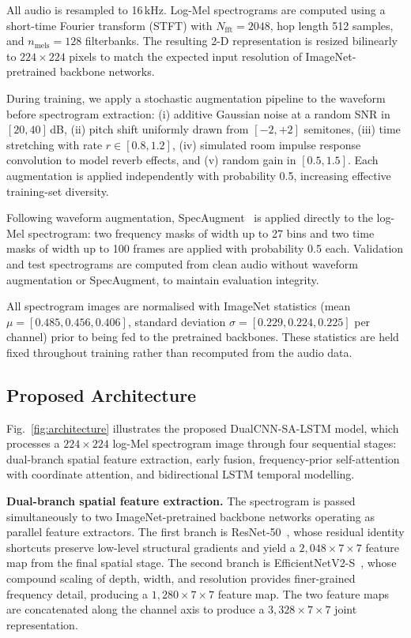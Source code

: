 \documentclass[conference]{IEEEtran}
\begin{document}
All audio is resampled to 16\,kHz. Log-Mel spectrograms are computed using a short-time Fourier transform (STFT) with $N_{\text{fft}}=2048$, hop length 512 samples, and $n_{\text{mels}}=128$ filterbanks. The resulting 2-D representation is resized bilinearly to $224\times224$ pixels to match the expected input resolution of ImageNet-pretrained backbone networks.

During training, we apply a stochastic augmentation pipeline to the waveform before spectrogram extraction: (i) additive Gaussian noise at a random SNR in $[20, 40]$\,dB, (ii) pitch shift uniformly drawn from $[-2, +2]$ semitones, (iii) time stretching with rate $r \in [0.8, 1.2]$, (iv) simulated room impulse response convolution to model reverb effects, and (v) random gain in $[0.5, 1.5]$. Each augmentation is applied independently with probability 0.5, increasing effective training-set diversity.

Following waveform augmentation, SpecAugment~\cite{park2019} is applied directly to the log-Mel spectrogram: two frequency masks of width up to 27 bins and two time masks of width up to 100 frames are applied with probability 0.5 each. Validation and test spectrograms are computed from clean audio without waveform augmentation or SpecAugment, to maintain evaluation integrity.

All spectrogram images are normalised with ImageNet statistics (mean $\mu = [0.485, 0.456, 0.406]$, standard deviation $\sigma = [0.229, 0.224, 0.225]$ per channel) prior to being fed to the pretrained backbones. These statistics are held fixed throughout training rather than recomputed from the audio data.

\subsection{Proposed Architecture}

Fig.~\ref{fig:architecture} illustrates the proposed DualCNN-SA-LSTM model, which processes a $224\times224$ log-Mel spectrogram image through four sequential stages: dual-branch spatial feature extraction, early fusion, frequency-prior self-attention with coordinate attention, and bidirectional LSTM temporal modelling.

\textbf{Dual-branch spatial feature extraction.} The spectrogram is passed simultaneously to two ImageNet-pretrained backbone networks operating as parallel feature extractors. The first branch is ResNet-50~\cite{he2016}, whose residual identity shortcuts preserve low-level structural gradients and yield a $2{,}048\times 7\times 7$ feature map from the final spatial stage. The second branch is EfficientNetV2-S~\cite{tan2021}, whose compound scaling of depth, width, and resolution provides finer-grained frequency detail, producing a $1{,}280\times 7\times 7$ feature map. The two feature maps are concatenated along the channel axis to produce a $3{,}328\times 7\times 7$ joint representation.
\end{document}
